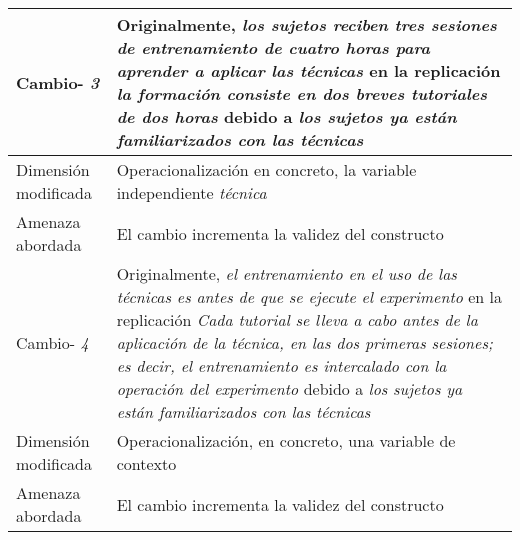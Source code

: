\begin{table}
\begin{tabular}{| p{3.3cm} | p{9cm} |}
Cambio- \textit{3}   & \parbox[t]{9cm} {Originalmente,  \textit{ los sujetos reciben tres sesiones de entrenamiento de cuatro horas para aprender a aplicar las técnicas  } } \parbox[t]{9cm}{en la replicación \textit{ la formación consiste en dos breves tutoriales de dos horas } }  debido a  \textit{los sujetos ya están familiarizados con las técnicas } \\  \hline
Dimensión modificada & 
Operacionalización en concreto, la variable independiente \textit {técnica} \\  \hline 
Amenaza abordada  & El cambio incrementa la validez del constructo  \\  \hline
 \hline

Cambio- \textit{4}   & \parbox[t]{9cm} {Originalmente,  \textit{el entrenamiento en el uso de las técnicas es antes de que se ejecute el experimento } } \parbox[t]{9cm}{en la replicación \textit{Cada tutorial se lleva a cabo antes de la aplicación de la técnica, en las dos primeras sesiones; es decir, el entrenamiento es intercalado con la operación del experimento } }  debido a  \textit{los sujetos ya están familiarizados con las técnicas} \\  \hline
Dimensión modificada & Operacionalización, en concreto, una variable de contexto \\  \hline 
Amenaza abordada  & El cambio incrementa la validez del constructo  \\  \hline
 

\end{tabular}
\label{tab:plantillaUPV}
\end{table}




